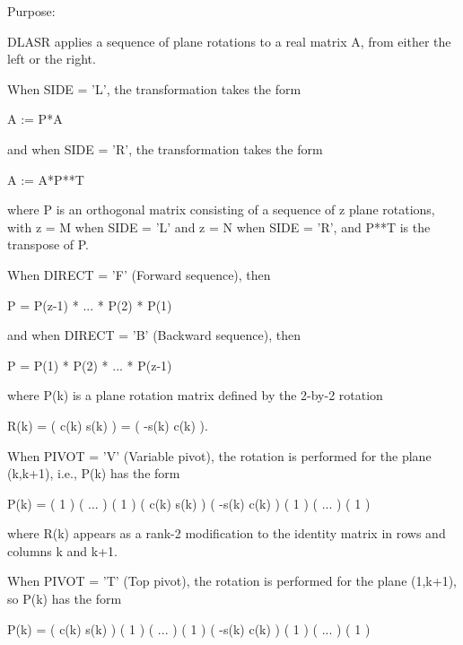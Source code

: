  \begin{DoxyParagraph}{Purpose\+: }
\begin{DoxyVerb} DLASR applies a sequence of plane rotations to a real matrix A,
 from either the left or the right.
 
 When SIDE = 'L', the transformation takes the form
 
    A := P*A
 
 and when SIDE = 'R', the transformation takes the form
 
    A := A*P**T
 
 where P is an orthogonal matrix consisting of a sequence of z plane
 rotations, with z = M when SIDE = 'L' and z = N when SIDE = 'R',
 and P**T is the transpose of P.
 
 When DIRECT = 'F' (Forward sequence), then
 
    P = P(z-1) * ... * P(2) * P(1)
 
 and when DIRECT = 'B' (Backward sequence), then
 
    P = P(1) * P(2) * ... * P(z-1)
 
 where P(k) is a plane rotation matrix defined by the 2-by-2 rotation
 
    R(k) = (  c(k)  s(k) )
         = ( -s(k)  c(k) ).
 
 When PIVOT = 'V' (Variable pivot), the rotation is performed
 for the plane (k,k+1), i.e., P(k) has the form
 
    P(k) = (  1                                            )
           (       ...                                     )
           (              1                                )
           (                   c(k)  s(k)                  )
           (                  -s(k)  c(k)                  )
           (                                1              )
           (                                     ...       )
           (                                            1  )
 
 where R(k) appears as a rank-2 modification to the identity matrix in
 rows and columns k and k+1.
 
 When PIVOT = 'T' (Top pivot), the rotation is performed for the
 plane (1,k+1), so P(k) has the form
 
    P(k) = (  c(k)                    s(k)                 )
           (         1                                     )
           (              ...                              )
           (                     1                         )
           ( -s(k)                    c(k)                 )
           (                                 1             )
           (                                      ...      )
           (                                             1 )
 

\end{DoxyVerb}
\end{DoxyParagraph}
